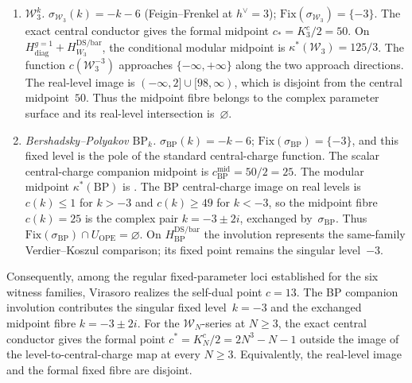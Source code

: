 \begin{theorem}
\begin{enumerate}
\item \emph{$\mathcal{W}_3^k$.} $\sigma_{\mathcal{W}_3}(k) = -k - 6$
 \textup{(}Feigin--Frenkel at $h^\vee = 3$\textup{)};
 $\mathrm{Fix}(\sigma_{\mathcal{W}_3}) = \{-3\}$.  The exact central
 conductor gives the formal midpoint $c_* = K_3^c/2 = 50$.  On
 $H_{\mathrm{diag}}^{g=1}+H_{W_3}^{\mathrm{DS/bar}}$, the conditional
 modular midpoint is $\kappa^*(\mathcal{W}_3) = 125/3$.
 The function $c(\mathcal{W}_3^{-3})$ approaches
 $\{-\infty,+\infty\}$ along the two
 approach directions.  The real-level image is
 $(-\infty,2]\cup[98,\infty)$, which is disjoint from the central
 midpoint~$50$.  Thus the midpoint fibre belongs to the complex
 parameter surface and its real-level intersection is~$\varnothing$.

\item \emph{Bershadsky--Polyakov $\mathrm{BP}_k$.}
 $\sigma_{\mathrm{BP}}(k) = -k - 6$;
 $\mathrm{Fix}(\sigma_{\mathrm{BP}}) = \{-3\}$, and this fixed level
 is the pole of the standard central-charge function.  The scalar
 central-charge companion midpoint is
 $c^{\mathrm{mid}}_{\mathrm{BP}}=50/2=25$.  The modular midpoint
 $\kappa^*(\mathrm{BP})$ is \ClaimStatusOpen.
 The BP central-charge image on real levels is
 $c(k) \leq 1$ for $k > -3$ and $c(k) \geq 49$ for $k < -3$, so
 the midpoint fibre $c(k)=25$ is the complex pair
 $k=-3\pm2i$, exchanged by~$\sigma_{\mathrm{BP}}$.
 Thus
 $\mathrm{Fix}(\sigma_{\mathrm{BP}})\cap U_{\mathrm{OPE}}=\varnothing$.
 On
 $H_{\mathrm{BP}}^{\mathrm{DS/bar}}$ the involution represents the
 same-family Verdier--Koszul comparison; its fixed point remains the
 singular level~$-3$.
\end{enumerate}
Consequently, among the regular fixed-parameter loci established for
the six witness families, Virasoro realizes the self-dual point
$c=13$.  The BP companion involution contributes the singular fixed
level~$k=-3$ and the exchanged midpoint fibre $k=-3\pm2i$. For the
$\mathcal{W}_N$-series at $N \geq 3$, the exact central conductor
gives the formal point $c^* = K_N^c/2 = 2N^3 - N - 1$ outside the
image of the level-to-central-charge map at every $N \geq 3$.
Equivalently, the real-level image and the formal fixed fibre are
disjoint.
\end{theorem}

